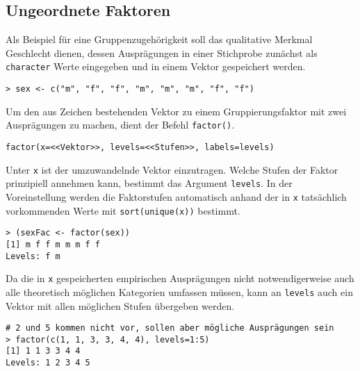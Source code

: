\subsection{Ungeordnete Faktoren}

Als Beispiel für eine Gruppenzugehörigkeit soll das qualitative Merkmal Geschlecht dienen, dessen Ausprägungen in einer Stichprobe zunächst als \lstinline!character! Werte eingegeben und in einem Vektor gespeichert werden.
\begin{lstlisting}
> sex <- c("m", "f", "f", "m", "m", "m", "f", "f")
\end{lstlisting}

Um den aus Zeichen bestehenden Vektor zu einem Gruppierungsfaktor mit zwei Ausprägungen zu machen, dient der Befehl \lstinline!factor()!.
\begin{lstlisting}
factor(x=<<Vektor>>, levels=<<Stufen>>, labels=levels)
\end{lstlisting}

Unter \lstinline!x! ist der umzuwandelnde Vektor einzutragen. Welche Stufen der Faktor prinzipiell annehmen kann, bestimmt das Argument \lstinline!levels!. In der Voreinstellung werden die Faktorstufen automatisch anhand der in \lstinline!x! tatsächlich vorkommenden Werte mit \lstinline!sort(unique(x))! bestimmt.
\begin{lstlisting}
> (sexFac <- factor(sex))
[1] m f f m m m f f
Levels: f m
\end{lstlisting}

Da die in \lstinline!x! gespeicherten empirischen Ausprägungen nicht notwendigerweise auch alle theoretisch möglichen Kategorien umfassen müssen, kann an \lstinline!levels! auch ein Vektor mit allen möglichen Stufen übergeben werden.
\begin{lstlisting}
# 2 und 5 kommen nicht vor, sollen aber mögliche Ausprägungen sein
> factor(c(1, 1, 3, 3, 4, 4), levels=1:5)
[1] 1 1 3 3 4 4
Levels: 1 2 3 4 5
\end{lstlisting}

